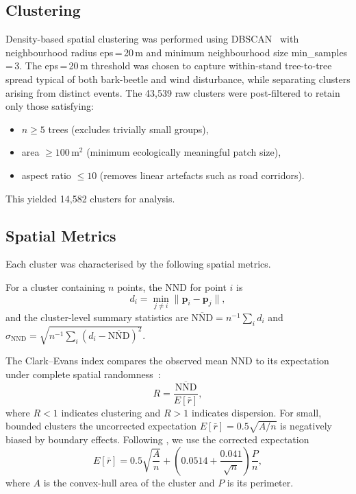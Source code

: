 \documentclass[twocolumn]{article}
\begin{document}
\subsection{Clustering}
\label{sec:clustering}

Density-based spatial clustering was performed using DBSCAN~\citep{ester1996density} with
neighbourhood radius eps\,=\,20\,m and minimum neighbourhood size min\_samples\,=\,3.
The eps\,=\,20\,m threshold was chosen to capture within-stand tree-to-tree spread typical
of both bark-beetle and wind disturbance, while separating clusters arising from distinct
events. The 43,539 raw clusters were post-filtered to retain only those satisfying:
\begin{itemize}
  \item $n \geq 5$ trees (excludes trivially small groups),
  \item area $\geq 100$\,m$^2$ (minimum ecologically meaningful patch size),
  \item aspect ratio $\leq 10$ (removes linear artefacts such as road corridors).
\end{itemize}
This yielded 14,582 clusters for analysis.

\subsection{Spatial Metrics}
\label{sec:metrics}

Each cluster was characterised by the following spatial metrics.

For a cluster containing $n$ points, the NND for point $i$ is
\begin{equation}
  d_i = \min_{j \neq i} \| \mathbf{p}_i - \mathbf{p}_j \|,
\end{equation}
and the cluster-level summary statistics are $\overline{\mathrm{NND}} = n^{-1}\sum_i d_i$
and $\sigma_{\mathrm{NND}} = \sqrt{n^{-1}\sum_i (d_i - \overline{\mathrm{NND}})^2}$.

The Clark--Evans index compares the observed mean NND to its expectation under complete
spatial randomness~\citep{clarkevans1954}:
\begin{equation}
  R = \frac{\overline{\mathrm{NND}}}{E[\bar{r}]},
\end{equation}
where $R < 1$ indicates clustering and $R > 1$ indicates dispersion.
For small, bounded clusters the uncorrected expectation $E[\bar{r}] = 0.5\sqrt{A/n}$
is negatively biased by boundary effects. Following \citet{donnelly1978}, we use the
corrected expectation
\begin{equation}
  E[\bar{r}] = 0.5\sqrt{\frac{A}{n}}
              + \left(0.0514 + \frac{0.041}{\sqrt{n}}\right)\frac{P}{n},
  \label{eq:donnelly}
\end{equation}
where $A$ is the convex-hull area of the cluster and $P$ is its perimeter.
\end{document}
